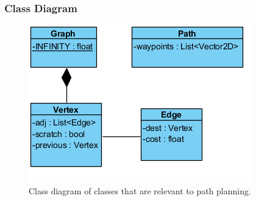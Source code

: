 \subsubsection{Class Diagram}
\begin{figure}[H]
	\centering
	\includegraphics[width=\linewidth]{Images/pathplanningclassdiagram}
	\caption{Class diagram of classes that are relevant to path planning.}
	\label{fig:pathplanningclassdiagram}
\end{figure}